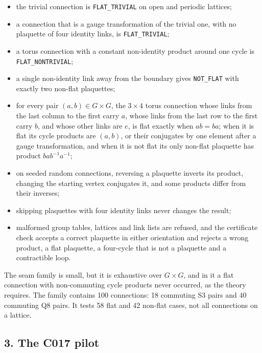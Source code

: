 \documentclass[
  11pt,
]{article}
\providecommand{\tightlist}{%
  \setlength{\itemsep}{0pt}\setlength{\parskip}{0pt}}
\begin{document}
\begin{itemize}
\tightlist
\item
  the trivial connection is \texttt{FLAT\_\allowbreak{}TRIVIAL} on open
  and periodic lattices;
\item
  a connection that is a gauge transformation of the trivial one, with
  no plaquette of four identity links, is
  \texttt{FLAT\_\allowbreak{}TRIVIAL};
\item
  a torus connection with a constant non-identity product around one
  cycle is \texttt{FLAT\_\allowbreak{}NONTRIVIAL};
\item
  a single non-identity link away from the boundary gives
  \texttt{NOT\_\allowbreak{}FLAT} with exactly two non-flat plaquettes;
\item
  for every pair \((a,b) \in G \times G\), the \(3 \times 4\) torus
  connection whose links from the last column to the first carry \(a\),
  whose links from the last row to the first carry \(b\), and whose
  other links are \(e\), is flat exactly when \(ab = ba\); when it is
  flat its cycle products are \((a, b)\), or their conjugates by one
  element after a gauge transformation, and when it is not flat its only
  non-flat plaquette has product \(b a b^{-1} a^{-1}\);
\item
  on seeded random connections, reversing a plaquette inverts its
  product, changing the starting vertex conjugates it, and some products
  differ from their inverses;
\item
  skipping plaquettes with four identity links never changes the result;
\item
  malformed group tables, lattices and link lists are refused, and the
  certificate check accepts a correct plaquette in either orientation
  and rejects a wrong product, a flat plaquette, a four-cycle that is
  not a plaquette and a contractible loop.
\end{itemize}

The seam family is small, but it is exhaustive over \(G \times G\), and
in it a flat connection with non-commuting cycle products never
occurred, as the theory requires. The family contains 100 connections:
18 commuting S3 pairs and 40 commuting Q8 pairs. It tests 58 flat and 42
non-flat cases, not all connections on a lattice.

\hypertarget{the-c017-pilot}{%
\subsection{3. The C017 pilot}\label{the-c017-pilot}}
\end{document}
